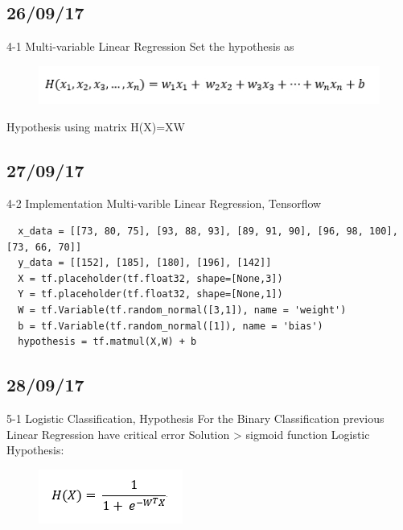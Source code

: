 \documentclass{article}
\begin{document}
\begin{CJK}{UTF8}{}
\subsection{26/09/17}
4-1 Multi-variable Linear Regression\newline
Set the hypothesis as\newline
\begin{figure}[h!]
\centering
\includegraphics[scale=0.6]{3.jpg}
\end{figure}

Hypothesis using matrix\newline
H(X)=XW

\subsection{27/09/17}
4-2 Implementation Multi-varible Linear Regression, Tensorflow\newline
\begin{verbatim}
  x_data = [[73, 80, 75], [93, 88, 93], [89, 91, 90], [96, 98, 100], [73, 66, 70]]
  y_data = [[152], [185], [180], [196], [142]]
  X = tf.placeholder(tf.float32, shape=[None,3])
  Y = tf.placeholder(tf.float32, shape=[None,1])
  W = tf.Variable(tf.random_normal([3,1]), name = 'weight')
  b = tf.Variable(tf.random_normal([1]), name = 'bias')
  hypothesis = tf.matmul(X,W) + b

\end{verbatim}\newline

\subsection{28/09/17}
5-1 Logistic Classification, Hypothesis\newline
For the Binary Classification previous Linear Regression have critical error\newline
Solution > sigmoid function\newline
Logistic Hypothesis:\newline
\begin{figure}[h!]
\centering
\includegraphics[scale=0.6]{4.jpg}
\end{figure}


\end{CJK}
\end{document}
